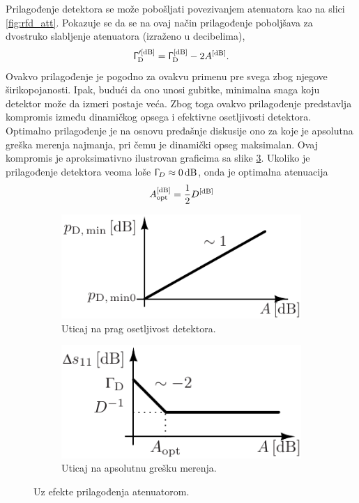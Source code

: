 \documentclass[a4paper, 12pt, diplomski]{etf}
\newcommand{\unit}[1]{\,{\rm #1}}
\begin{document}
Prilagođenje detektora se može pobošljati
povezivanjem atenuatora kao na slici \ref{fig:rfd_att}. 
Pokazuje se da se na ovaj način prilagođenje poboljšava za 
dvostruko slabljenje atenuatora (izraženo u decibelima),
\begin{equation}
    \Upgamma_{\rm D}'^{\rm [dB]}= \Upgamma_{\rm D}^{\rm [dB]} - 2A^{\rm [dB]}.
\end{equation}
Ovakvo prilagođenje je pogodno za ovakvu primenu pre svega zbog 
njegove širikopojanosti. Ipak, budući da ono unosi gubitke, minimalna snaga
koju detektor može da izmeri postaje veća. Zbog toga ovakvo prilagođenje 
predstavlja kompromis između dinamičkog opsega i efektivne osetljivosti 
detektora. Optimalno prilagođenje je na osnovu pređašnje diskusije 
ono za koje je apsolutna 
greška merenja najmanja, pri čemu je dinamički 
opseg maksimalan. Ovaj kompromis je aproksimativno ilustrovan 
 graficima
sa slike \ref{fig:attcomp}. Ukoliko je prilagođenje detektora 
veoma loše $\Upgamma_D \approx 0\unit{dB}$, onda je optimalna
atenuacija
\begin{equation}
    A_{\rm opt}^{\rm [dB]} = \dfrac{1}{2} D^{\rm [dB]}
\end{equation}

\begin{figure}[ht!]
    \hfill
    \begin{subfigure}[b]{0.49\textwidth}
        \centering
        \includegraphics[scale=1]{fig/pA_plot.pdf}
        \caption{Uticaj na prag osetljivost detektora.}
        \label{fig:pA}
    \end{subfigure}
    \hfill
    \begin{subfigure}[b]{0.49\textwidth}
        \centering
        \includegraphics[scale=1]{fig/gD_plot.pdf}
        \caption{Uticaj na apsolutnu grešku merenja.}
        \label{fig:gD}
    \end{subfigure}
    \hfill
    \caption{Uz efekte prilagođenja atenuatorom.}
    \label{fig:attcomp}
\end{figure}
\end{document}
